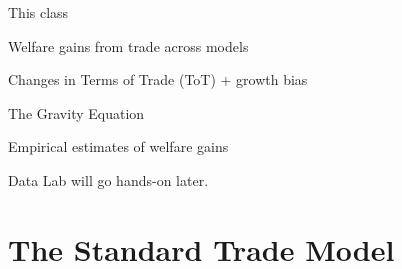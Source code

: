 \documentclass[notes,11pt, aspectratio=169, xcolor=table]{beamer}
\newenvironment{wideitemize}{\itemize\addtolength{\itemsep}{10pt}}{\enditemize}
\begin{document}
\begin{frame}{This class}
\begin{wideitemize}
    \item Welfare gains from trade across models
    \item Changes in Terms of Trade (ToT) + growth bias 
    \item The Gravity Equation
    \item Empirical estimates of welfare gains
    \item Data Lab will go hands-on later.
\end{wideitemize}
\end{frame}

\section{The Standard Trade Model}
\end{document}
